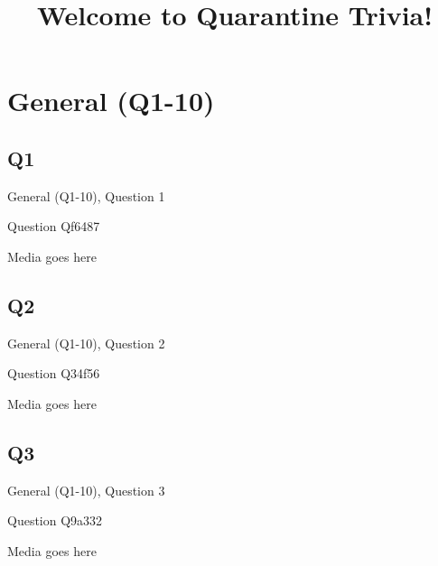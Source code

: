 \documentclass[11pt]{beamer}
\begin{document}
\title{Welcome to Quarantine Trivia!}
\date{}

\begin{frame}
  \titlepage{}
\end{frame}

    

\section{General (Q1-10)}
    

\subsection*{Q1}
\begin{frame}[t]{General (Q1-10), Question 1}
\vspace{2em}
\begin{block}{Question}
Qf6487
\end{block}
\begin{center}
Media goes here
\end{center}
\end{frame}
    

\subsection*{Q2}
\begin{frame}[t]{General (Q1-10), Question 2}
\vspace{2em}
\begin{block}{Question}
Q34f56
\end{block}
\begin{center}
Media goes here
\end{center}
\end{frame}
    

\subsection*{Q3}
\begin{frame}[t]{General (Q1-10), Question 3}
\vspace{2em}
\begin{block}{Question}
Q9a332
\end{block}
\begin{center}
Media goes here
\end{center}
\end{frame}
    
\end{document}
